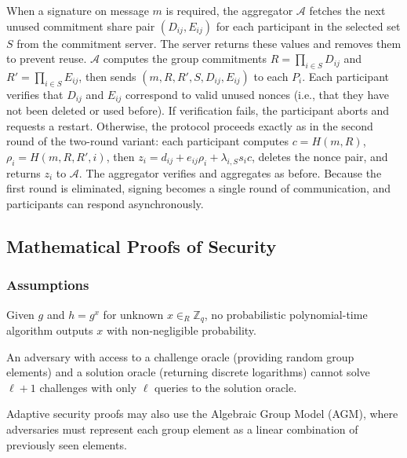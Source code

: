 When a signature on message \(m\) is required, the aggregator \(\mathcal{A}\) fetches the next unused commitment share pair \((D_{ij},E_{ij})\) for each participant in the selected set \(S\) from the commitment server. The server returns these values and removes them to prevent reuse. \(\mathcal{A}\) computes the group commitments \(R=\prod_{i\in S}D_{ij}\) and \(R'=\prod_{i\in S}E_{ij}\), then sends \((m,R,R',S,D_{ij},E_{ij})\) to each \(P_i\). Each participant verifies that \(D_{ij}\) and \(E_{ij}\) correspond to valid unused nonces (i.e., that they have not been deleted or used before). If verification fails, the participant aborts and requests a restart. Otherwise, the protocol proceeds exactly as in the second round of the two-round variant: each participant computes \(c=H(m,R)\), \(\rho_i = H(m,R,R',i)\), then \(z_i = d_{ij} + e_{ij}\rho_i + \lambda_{i,S}s_i c\), deletes the nonce pair, and returns \(z_i\) to \(\mathcal{A}\). The aggregator verifies and aggregates as before. Because the first round is eliminated, signing becomes a single round of communication, and participants can respond asynchronously.

\subsection{Mathematical Proofs of Security}

\subsubsection{Assumptions}

\begin{definition}
Given \(g\) and \(h=g^x\) for unknown \(x\in_R\mathbb{Z}_q\), no probabilistic polynomial-time algorithm outputs \(x\) with non-negligible probability.
\end{definition}

\begin{definition}
An adversary with access to a challenge oracle (providing random group elements) and a solution oracle (returning discrete logarithms) cannot solve \(\ell+1\) challenges with only \(\ell\) queries to the solution oracle.
\end{definition}

Adaptive security proofs may also use the Algebraic Group Model (AGM), where adversaries must represent each group element as a linear combination of previously seen elements.

